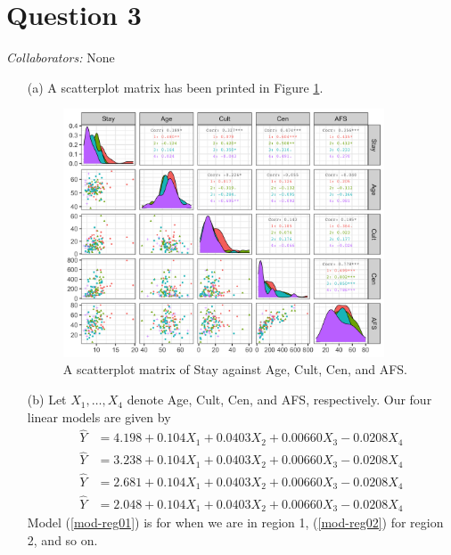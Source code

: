 \documentclass[10pt]{article}
\newcommand{\mycolaba}[1]{\textcolor{colabcol}{\textsl{Collaborators:}} #1}
\begin{document}
\section{Question 3} \noindent
\mycolaba{None}
\begin{itemize}
    \item[(a)] A scatterplot matrix has been printed in Figure \ref{fig-q03-corr}.
    \begin{figure}[ht]
        \centering
        \includegraphics[width = 0.9\textwidth]{img/q03-correlation.png}
        \caption{A scatterplot matrix of Stay against Age, Cult, Cen, and AFS.}
        \label{fig-q03-corr}
    \end{figure}
    \item[(b)] Let \(X_1, \ldots, X_4\) denote Age, Cult, Cen, and AFS, respectively. Our four linear models are given by 
    \begin{subequations}
        \begin{align}
            \hat{Y} &= 4.198 + 0.104 X_1 + 0.0403 X_2 + 0.00660 X_3 - 0.0208 X_4 \label{mod-reg01} \\
            \hat{Y} &= 3.238 + 0.104 X_1 + 0.0403 X_2 + 0.00660 X_3 - 0.0208 X_4 \label{mod-reg02} \\
            \hat{Y} &= 2.681 + 0.104 X_1 + 0.0403 X_2 + 0.00660 X_3 - 0.0208 X_4 \label{mod-reg03} \\
            \hat{Y} &= 2.048 + 0.104 X_1 + 0.0403 X_2 + 0.00660 X_3 - 0.0208 X_4 \label{mod-reg04}
        \end{align}
    \end{subequations}
    Model (\ref{mod-reg01}) is for when we are in region 1, (\ref{mod-reg02}) for region 2, and so on. 

\end{itemize}
\end{document}
